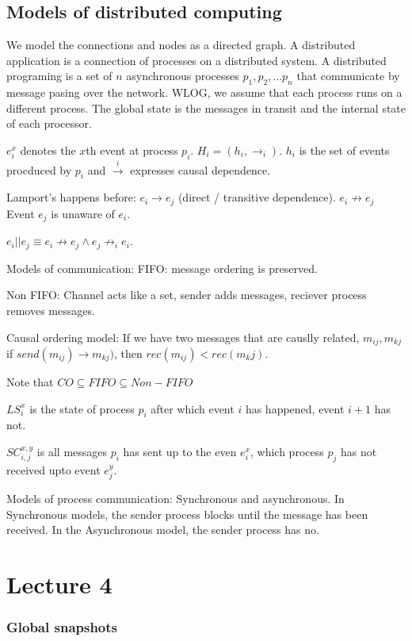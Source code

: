 \documentclass[11pt]{book}
\begin{document}
\section{Models of distributed computing}
We model the connections and nodes as a directed graph. A distributed application
is a connection of processes on a distributed system. A distributed programing
is a set of $n$ asynchronous processes $p_1, p_2, \dots p_n$ that communicate
by message pasing over the network. WLOG, we assume that each process runs
on a different process. The global state is the messages in transit and the
internal state of each processor.

$e_i^x$ denotes the $x$th event at process $p_i$.  $H_i = (h_i, \rightarrow_i)$.
$h_i$ is the set of events procduced by $p_i$ and $\xrightarrow{i}$ expresses
causal dependence.

Lamport's happens before: $e_i \rightarrow e_j$ (direct / transitive dependence).
$e_i \not \rightarrow e_j$ Event $e_j$ is unaware of $e_i$.

$e_i || e_j \equiv e_i \not \rightarrow e_j \land e_j \not \rightarrow_i e_i$.


Models of communication: FIFO: message ordering is preserved.

Non FIFO: Channel acts like a set, sender adds messages, reciever process removes
messages.


Causal ordering model: If we have two messages that are causlly related, 
$m_{ij}, m_{kj}$ if $send(m_{ij}) \rightarrow m_{kj})$, then $rec(m_{ij}) < rec(m_kj)$.

Note that $CO \subseteq FIFO \subseteq Non-FIFO$

$LS_i^x$ is the state of process $p_i$ after which event $i$ has happened, event $i + 1$ has not.

$SC_{i, j}^{x, y}$ is all messages $p_i$ has sent up to the even $e_i^x$, which
process $p_j$ has not received upto event $e^y_j$.

Models of process communication: Synchronous and asynchronous.
In Synchronous models, the sender process blocks until the message has been received.
In the Asynchronous model, the sender process has no.

\chapter{Lecture 4}

\subsection{Global snapshots}
\end{document}
